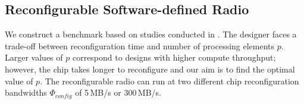 \documentclass[runningheads,a4paper]{llncs}
\begin{document}


\subsection{Reconfigurable Software-defined Radio}
\label{recradiobench}


We construct a benchmark based on studies conducted in \cite{Becker:2009:PDR:1530588.1530595}. The designer faces a trade-off between reconfiguration time and number of processing elements $p$. Larger values of $p$ correspond to designs with higher compute throughput; however, the chip takes longer to reconfigure and our aim is to find the optimal value of $p$. The reconfigurable radio can run at two different chip reconfiguration bandwidths $\Phi_{config}$ of 5\,MB/s or 300\,MB/s.
\end{document}
